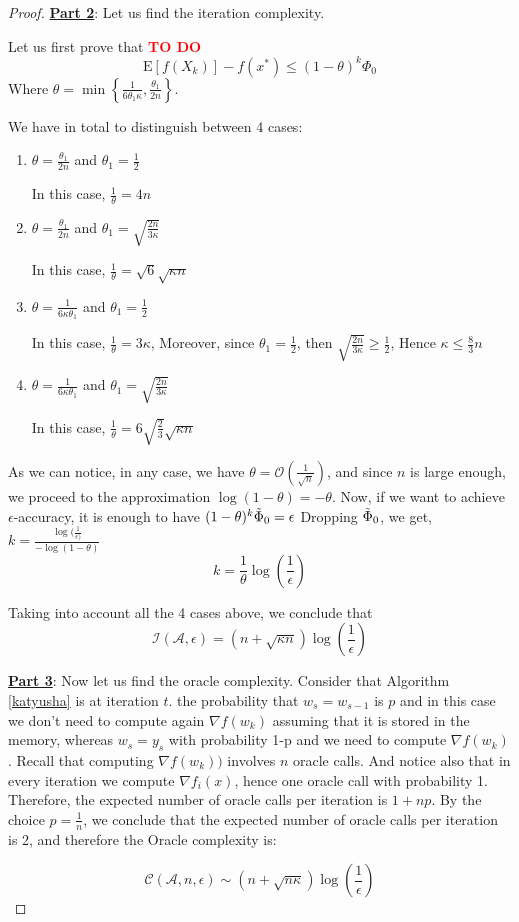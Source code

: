 \documentclass[12pt]{report}
\newcommand{\E}{\mathrm{E}}
\begin{document}
\begin{proof}
\textbf{\underline{Part 2}}: Let us find the iteration complexity.

Let us first prove that {\huge\textbf{\textcolor{red}{TO DO}}} $$\E[f(X_k)] -f(x^*)\leq (1-\theta)^k \Phi_0$$
Where $\theta=\min\left\{\frac{1}{6\theta_1\kappa},\frac{\theta_1}{2n}\right\}$.

We have in total to distinguish between 4 cases:
\begin{enumerate}
    \item $\theta=\frac{\theta_1}{2n}$ and $\theta_1=\frac{1}{2}$
    
In this case, $\frac{1}{\theta}=4n$

    \item $\theta=\frac{\theta_1}{2n}$ and $\theta_1=\sqrt{\frac{2n}{3\kappa}}$
    
In this case, $\frac{1}{\theta}=\sqrt{6}\sqrt{\kappa n}$

    \item $\theta=\frac{1}{6\kappa \theta_1}$ and $\theta_1=\frac{1}{2}$
    
In this case, $\frac{1}{\theta}=3\kappa$,
Moreover, since $\theta_1=\frac{1}{2}$, then $\sqrt{\frac{2n}{3\kappa}}\geq \frac{1}{2}$, Hence
$\kappa \leq \frac{8}{3}n $


    \item $\theta=\frac{1}{6\kappa \theta_1}$ and $\theta_1=\sqrt{\frac{2n}{3\kappa}}$
    
    
In this case, $\frac{1}{\theta}=6\sqrt{\frac{2}{3}}\sqrt{\kappa n}$
\end{enumerate}


As we can notice, in any case, we have $\theta=\mathcal{O}\left({\frac{1}{\sqrt{n}}}\right)$, and since $n$ is large enough, we proceed to the approximation $\log(1-\theta)=-\theta$.
Now, if we want to achieve $\epsilon$-accuracy, it is enough to have $(1-\theta)^k\Tilde{\Phi}_0=\epsilon$
Dropping $\Tilde{\Phi}_0$, we get,
$k=\frac{\log(\frac{1}{\epsilon)}}{-\log(1-\theta)}$
$$k=\frac{1}{\theta}\log\left(\frac{1}{\epsilon}\right)$$

Taking into account all the 4 cases above, we conclude that $$\mathcal{I}(\mathcal{A},\epsilon)= (n+\sqrt{\kappa n})\log\left(\frac{1}{\epsilon}\right) $$

\textbf{\underline{Part 3}}: Now let us find the oracle complexity.
Consider that Algorithm \ref{katyusha} is at iteration $t$. the probability that $w_{s}=w_{s-1}$ is $p$ and in this case we don't need to compute again $\nabla f(w_k)$ assuming that it is stored in the memory, whereas $w_{s}=y_s$ with probability 1-p and we need to compute  $\nabla f(w_k)$. Recall that computing $\nabla f(w_k))$ involves $n$ oracle calls. And notice also that in every iteration we compute $\nabla f_i(x)$, hence one oracle call with probability 1.
Therefore, the expected number of oracle calls per iteration is $1+np$.
By the choice $p=\frac{1}{n}$, we conclude that the expected number of oracle calls per iteration is 2, and therefore the Oracle complexity is:

$$ \mathcal{C}(\mathcal{A},n,\epsilon)\sim \left(n+\sqrt{n\kappa} \right)\log\left(\frac{1}{\epsilon}\right)$$

\end{proof}
\end{document}

